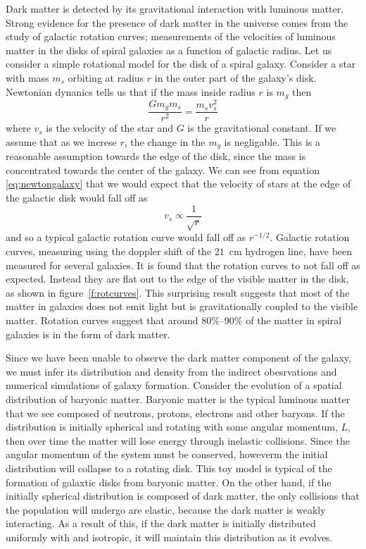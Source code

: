 Dark matter is detected by its gravitational interaction with luminous matter.
Strong evidence for the presence of dark matter in the universe comes from the
study of galactic rotation curves; measurements of the velocities of luminous
matter in the disks of spiral galaxies as a function of galactic radius.  Let
us consider a simple rotational model for the disk of a spiral galaxy.
Consider a star with mass $m_s$ orbiting at radius $r$ in the outer part of
the galaxy's disk. Newtonian dynanics tells us that if the mass inside radius
$r$ is $m_g$ then
\begin{equation}
\frac{Gm_g m_s}{r^2} = \frac{m_s v_s^2}{r}
\label{eq:newtongalaxy}
\end{equation}
where $v_s$ is the velocity of the star and $G$ is the gravitational constant. 
If we assume that as we increse $r$, the change in the $m_g$ is negligable.
This is a reasonable assumption towards the edge of the disk, since the mass
is concentrated towards the center of the galaxy.  We can see from equation
\ref{eq:newtongalaxy} that we would expect that the velocity of stars at the
edge of the galactic disk would fall off as 
\begin{equation}
v_s \propto \frac{1}{\sqrt{r}}
\end{equation}
and so a typical galactic rotation curve would fall off as $r^{-1/2}$.
Galactic rotation curves, measuring using the doppler shift of the
$21$~cm hydrogen line, have been measured for several galaxies. It is found
that the rotation curves to not fall off as expected. Instead they are flat
out to the edge of the visible matter in the disk, as shown in
figure~\ref{f:rotcurves}.  This surprising result suggests that most of the
matter in galaxies does not emit light but is gravitationally coupled to the
visible matter. Rotation curves suggest that around 80\%--90\% of the matter
in spiral galaxies is in the form of dark matter\cite{Sancisi:1987}.

Since we have been unable to observe the dark matter component of the galaxy,
we must infer its distribution and density from the indirect obesrvations and
numerical simulations of galaxy formation. Consider the evolution of a spatial
distribution of baryonic matter. Baryonic matter is the typical luminous
matter that we see composed of neutrons, protons, electrons and other baryons.
If the distribution is initially spherical and rotating with some angular
momentum, $L$, then over time the matter will lose energy through inelastic
collisions. Since the angular momentum of the system must be conserved,
howeverm the initial distribution will collapse to a rotating disk.  This toy
model is typical of the formation of galaxtic disks from baryonic matter. On
the other hand, if the initially spherical distribution is composed of dark
matter, the only collisions that the population will undergo are elastic,
because the dark matter is weakly interacting. As a result of this, if the
dark matter is initially distributed uniformly with and isotropic, it will
maintain this distribution as it evolves.

